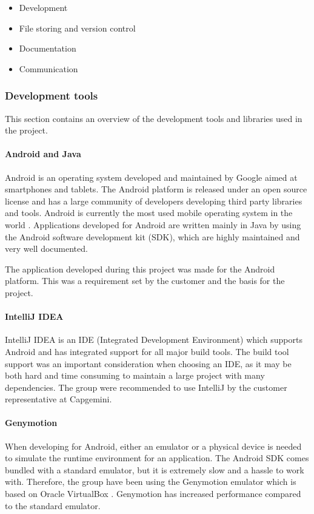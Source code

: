 \begin{itemize}
\item Development
\item File storing and version control
\item Documentation
\item Communication
\end{itemize}

\subsubsection{Development tools}
This section contains an overview of the development tools and libraries used in the project.
\paragraph*{Android and Java}
Android is an operating system developed and maintained by Google aimed at smartphones and tablets. The Android platform is released under an open source license and has a large community of developers developing third party libraries and tools. Android is currently the most used mobile operating system in the world \cite{android_pop}. Applications developed for Android are written mainly in Java by using the Android software development kit (SDK), which are highly maintained and very well documented.

The application developed during this project was made for the Android platform. This was a requirement set by the customer and the basis for the project.

\paragraph*{IntelliJ IDEA}
IntelliJ IDEA \cite{intellij} is an IDE (Integrated Development Environment) which supports Android and has integrated support for all major build tools. The build tool support was an important consideration when choosing an IDE, as it may be both hard and time consuming to maintain a large project with many dependencies. The group were recommended to use IntelliJ by the customer representative at Capgemini.

\paragraph*{Genymotion}
When developing for Android, either an emulator or a physical device is needed to simulate the runtime environment for an application. The Android SDK comes bundled with a standard emulator, but it is extremely slow and a hassle to work with. Therefore, the group have been using the Genymotion \cite{genymotion} emulator which is based on Oracle VirtualBox \cite{virtualBox}. Genymotion has increased performance compared to the standard emulator.

